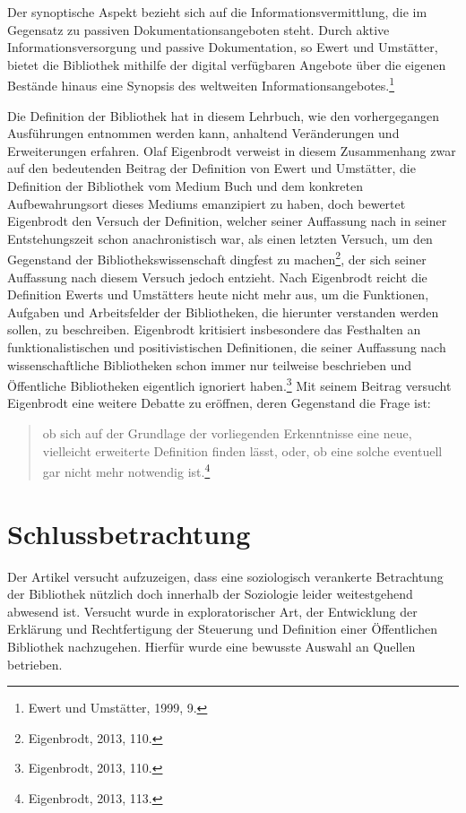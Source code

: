 \documentclass[a4paper,
fontsize=11pt,
oneside,
numbers=noperiodatend,
parskip=half-,
bibliography=totoc,
final
]{scrartcl}
\begin{document}
Der synoptische Aspekt bezieht sich auf die Informationsvermittlung, die
im Gegensatz zu passiven Dokumentationsangeboten steht. Durch aktive
Informationsversorgung und passive Dokumentation, so Ewert und
Umstätter, bietet die Bibliothek mithilfe der digital verfügbaren
Angebote über die eigenen Bestände hinaus eine Synopsis des weltweiten
Informationsangebotes.\footnote{Ewert und Umstätter, 1999, 9.}

Die Definition der Bibliothek hat in diesem Lehrbuch, wie den
vorhergegangen Ausführungen entnommen werden kann, anhaltend
Veränderungen und Erweiterungen erfahren. Olaf Eigenbrodt verweist in
diesem Zusammenhang zwar auf den bedeutenden Beitrag der Definition von
Ewert und Umstätter, die Definition der Bibliothek vom Medium Buch und
dem konkreten Aufbewahrungsort dieses Mediums emanzipiert zu haben, doch
bewertet Eigenbrodt den Versuch der Definition, welcher seiner
Auffassung nach in seiner Entstehungszeit schon anachronistisch war, als
einen letzten Versuch, um den Gegenstand der Bibliothekswissenschaft
dingfest zu machen\footnote{Eigenbrodt, 2013, 110.}, der sich seiner
Auffassung nach diesem Versuch jedoch entzieht. Nach Eigenbrodt reicht
die Definition Ewerts und Umstätters heute nicht mehr aus, um die
Funktionen, Aufgaben und Arbeitsfelder der Bibliotheken, die hierunter
verstanden werden sollen, zu beschreiben. Eigenbrodt kritisiert
insbesondere das Festhalten an funktionalistischen und positivistischen
Definitionen, die seiner Auffassung nach wissenschaftliche Bibliotheken
schon immer nur teilweise beschrieben und Öffentliche Bibliotheken
eigentlich ignoriert haben.\footnote{Eigenbrodt, 2013, 110.} Mit seinem
Beitrag versucht Eigenbrodt eine weitere Debatte zu eröffnen, deren
Gegenstand die Frage ist:

\begin{quote}
ob sich auf der Grundlage der vorliegenden Erkenntnisse eine neue,
vielleicht erweiterte Definition finden lässt, oder, ob eine solche
eventuell gar nicht mehr notwendig ist.\footnote{Eigenbrodt, 2013, 113.}
\end{quote}

\section*{Schlussbetrachtung}\label{schlussbetrachtung}

Der Artikel versucht aufzuzeigen, dass eine soziologisch verankerte
Betrachtung der Bibliothek nützlich doch innerhalb der Soziologie leider
weitestgehend abwesend ist. Versucht wurde in exploratorischer Art, der
Entwicklung der Erklärung und Rechtfertigung der Steuerung und
Definition einer Öffentlichen Bibliothek nachzugehen. Hierfür wurde eine
bewusste Auswahl an Quellen betrieben.
\end{document}
